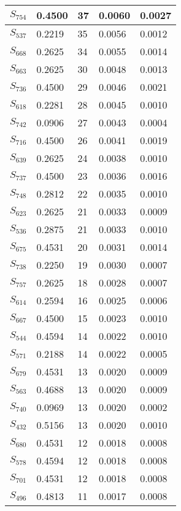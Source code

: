 \begin{xltabular}{\textwidth}{|X|X|X|X|X|}
 $S_{754}$ & 0.4500 & 37 & 0.0060 & 0.0027 \\ \hline
 $S_{537}$ & 0.2219 & 35 & 0.0056 & 0.0012 \\ \hline
 $S_{668}$ & 0.2625 & 34 & 0.0055 & 0.0014 \\ \hline
 $S_{663}$ & 0.2625 & 30 & 0.0048 & 0.0013 \\ \hline
 $S_{736}$ & 0.4500 & 29 & 0.0046 & 0.0021 \\ \hline
 $S_{618}$ & 0.2281 & 28 & 0.0045 & 0.0010 \\ \hline
 $S_{742}$ & 0.0906 & 27 & 0.0043 & 0.0004 \\ \hline
 $S_{716}$ & 0.4500 & 26 & 0.0041 & 0.0019 \\ \hline
 $S_{639}$ & 0.2625 & 24 & 0.0038 & 0.0010 \\ \hline
 $S_{737}$ & 0.4500 & 23 & 0.0036 & 0.0016 \\ \hline
 $S_{748}$ & 0.2812 & 22 & 0.0035 & 0.0010 \\ \hline
 $S_{623}$ & 0.2625 & 21 & 0.0033 & 0.0009 \\ \hline
 $S_{536}$ & 0.2875 & 21 & 0.0033 & 0.0010 \\ \hline
 $S_{675}$ & 0.4531 & 20 & 0.0031 & 0.0014 \\ \hline
 $S_{738}$ & 0.2250 & 19 & 0.0030 & 0.0007 \\ \hline
 $S_{757}$ & 0.2625 & 18 & 0.0028 & 0.0007 \\ \hline
 $S_{614}$ & 0.2594 & 16 & 0.0025 & 0.0006 \\ \hline
 $S_{667}$ & 0.4500 & 15 & 0.0023 & 0.0010 \\ \hline
 $S_{544}$ & 0.4594 & 14 & 0.0022 & 0.0010 \\ \hline
 $S_{571}$ & 0.2188 & 14 & 0.0022 & 0.0005 \\ \hline
 $S_{679}$ & 0.4531 & 13 & 0.0020 & 0.0009 \\ \hline
 $S_{563}$ & 0.4688 & 13 & 0.0020 & 0.0009 \\ \hline
 $S_{740}$ & 0.0969 & 13 & 0.0020 & 0.0002 \\ \hline
 $S_{432}$ & 0.5156 & 13 & 0.0020 & 0.0010 \\ \hline
 $S_{680}$ & 0.4531 & 12 & 0.0018 & 0.0008 \\ \hline
 $S_{578}$ & 0.4594 & 12 & 0.0018 & 0.0008 \\ \hline
 $S_{701}$ & 0.4531 & 12 & 0.0018 & 0.0008 \\ \hline
 $S_{496}$ & 0.4813 & 11 & 0.0017 & 0.0008 \\ \hline

\end{xltabular}
